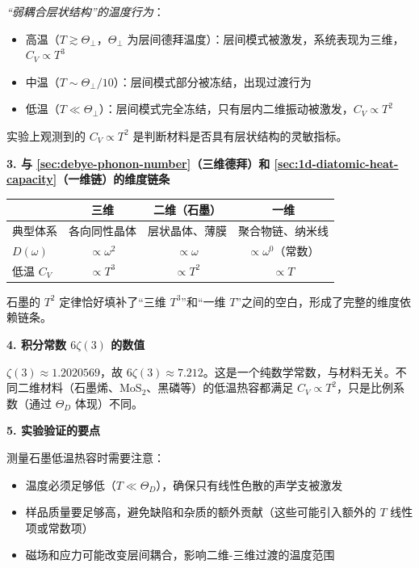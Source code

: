 \begin{insightbox}[物理图像与概念深化]
\textit{``弱耦合层状结构''的温度行为}：
\begin{itemize}
    \item 高温（$T\gtrsim\Theta_{\perp}$，$\Theta_{\perp}$ 为层间德拜温度）：层间模式被激发，系统表现为三维，$C_V\propto T^3$
    \item 中温（$T\sim\Theta_{\perp}/10$）：层间模式部分被冻结，出现过渡行为
    \item 低温（$T\ll\Theta_{\perp}$）：层间模式完全冻结，只有层内二维振动被激发，$C_V\propto T^2$
\end{itemize}

实验上观测到的 $C_V\propto T^2$ 是判断材料是否具有层状结构的灵敏指标。

\textbf{3. 与 \ref{sec:debye-phonon-number}（三维德拜）和 \ref{sec:1d-diatomic-heat-capacity}（一维链）的维度链条}

\begin{center}
\begin{tabular}{p{2.5cm}ccc}
\toprule
 & \textbf{三维} & \textbf{二维（石墨）} & \textbf{一维} \\
\midrule
典型体系 & 各向同性晶体 & 层状晶体、薄膜 & 聚合物链、纳米线 \\
$D(\omega)$ & $\propto\omega^2$ & $\propto\omega$ & $\propto\omega^0$（常数） \\
低温 $C_V$ & $\propto T^3$ & $\propto T^2$ & $\propto T$ \\
\bottomrule
\end{tabular}
\end{center}

石墨的 $T^2$ 定律恰好填补了``三维 $T^3$''和``一维 $T$''之间的空白，形成了完整的维度依赖链条。

\textbf{4. 积分常数 $6\zeta(3)$ 的数值}

$\zeta(3)\approx1.2020569$，故 $6\zeta(3)\approx7.212$。这是一个纯数学常数，与材料无关。不同二维材料（石墨烯、$\mathrm{MoS}_2$、黑磷等）的低温热容都满足 $C_V\propto T^2$，只是比例系数（通过 $\Theta_D$ 体现）不同。

\textbf{5. 实验验证的要点}

测量石墨低温热容时需要注意：
\begin{itemize}
    \item 温度必须足够低（$T\ll\Theta_D$），确保只有线性色散的声学支被激发
    \item 样品质量要足够高，避免缺陷和杂质的额外贡献（这些可能引入额外的 $T$ 线性项或常数项）
    \item 磁场和应力可能改变层间耦合，影响二维-三维过渡的温度范围
\end{itemize}
\end{insightbox}

